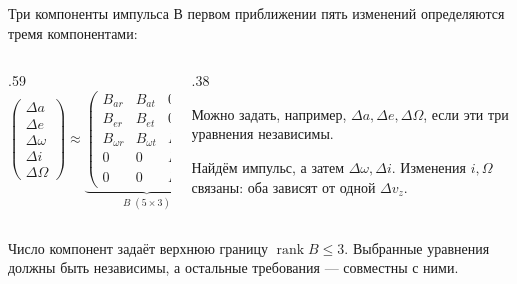 \documentclass[11pt,aspectratio=169,t]{beamer}
\begin{document}
\begin{frame}{Три компоненты импульса}
\setlength{\abovedisplayskip}{3pt}
\setlength{\belowdisplayskip}{3pt}
В первом приближении пять изменений определяются тремя компонентами:
\begin{columns}[T,onlytextwidth]
\begin{column}{.59\textwidth}
\[
\begin{pmatrix}
\Delta a\\ \Delta e\\ \Delta\omega\\ \Delta i\\ \Delta\Omega
\end{pmatrix}
\approx
\underbrace{\begin{pmatrix}
B_{ar}&B_{at}&0\\
B_{er}&B_{et}&0\\
B_{\omega r}&B_{\omega t}&B_{\omega z}\\
0&0&B_{iz}\\
0&0&B_{\Omega z}
\end{pmatrix}}_{B\; (5\times3)}
\begin{pmatrix}\Delta v_r\\ \Delta v_t\\ \Delta v_z\end{pmatrix}.
\]
\end{column}
\begin{column}{.38\textwidth}
\smallskip\raggedright
Можно задать, например, $\Delta a,\Delta e,\Delta\Omega$,
если эти три уравнения независимы.
\par\smallskip
Найдём импульс, а затем $\Delta\omega,\Delta i$.
Изменения $i,\Omega$ связаны: оба зависят от одной $\Delta v_z$.
\end{column}
\end{columns}
\begin{block}{Число компонент задаёт верхнюю границу}
\justifying
$\operatorname{rank}B\leq3$. Выбранные уравнения должны быть независимы,
а остальные требования --- совместны с ними.
\end{block}
\end{frame}
\end{document}
